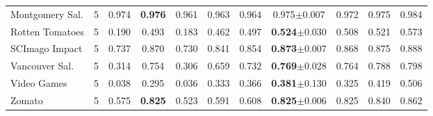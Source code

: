 \begin{tabular}{@{}lcccccccccc@{}}
Montgomery Sal. & 5 & 0.974 & \textbf{0.976} & 0.961 & 0.963 & 0.964 & 0.975\tiny{$\pm$0.007} & 0.972 & 0.975 & 0.984 \\
Rotten Tomatoes & 5 & 0.190 & 0.493 & 0.183 & 0.462 & 0.497 & \textbf{0.524}\tiny{$\pm$0.030} & 0.508 & 0.521 & 0.573 \\
SCImago Impact & 5 & 0.737 & 0.870 & 0.730 & 0.841 & 0.854 & \textbf{0.873}\tiny{$\pm$0.007} & 0.868 & 0.875 & 0.888 \\
Vancouver Sal. & 5 & 0.314 & 0.754 & 0.306 & 0.659 & 0.732 & \textbf{0.769}\tiny{$\pm$0.028} & 0.764 & 0.788 & 0.798 \\
Video Games & 5 & 0.038 & 0.295 & 0.036 & 0.333 & 0.366 & \textbf{0.381}\tiny{$\pm$0.130} & 0.325 & 0.419 & 0.506 \\
Zomato & 5 & 0.575 & \textbf{0.825} & 0.523 & 0.591 & 0.608 & \textbf{0.825}\tiny{$\pm$0.006} & 0.825 & 0.840 & 0.862 \\
\bottomrule
\end{tabular}
